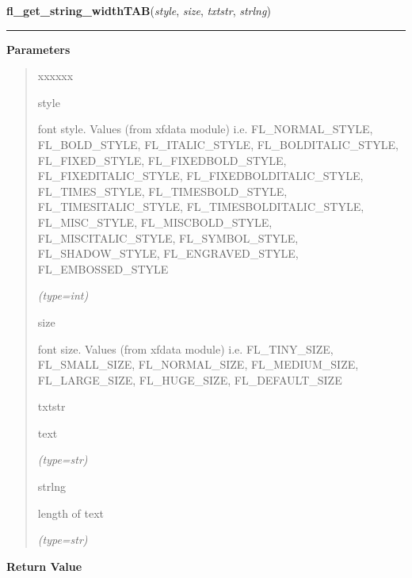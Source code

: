 \hspace{.8\funcindent}\begin{boxedminipage}{\funcwidth}

    \raggedright \textbf{fl\_get\_string\_widthTAB}(\textit{style}, \textit{size}, \textit{txtstr}, \textit{strlng})

    \vspace{-1.5ex}

    \rule{\textwidth}{0.5\fboxrule}
\setlength{\parskip}{2ex}
\setlength{\parskip}{1ex}
      \textbf{Parameters}
      \vspace{-1ex}

      \begin{quote}
        \begin{Ventry}{xxxxxx}

          \item[style]

          font style. Values (from xfdata module) i.e. FL\_NORMAL\_STYLE, 
          FL\_BOLD\_STYLE, FL\_ITALIC\_STYLE, FL\_BOLDITALIC\_STYLE, 
          FL\_FIXED\_STYLE, FL\_FIXEDBOLD\_STYLE, FL\_FIXEDITALIC\_STYLE, 
          FL\_FIXEDBOLDITALIC\_STYLE, FL\_TIMES\_STYLE, 
          FL\_TIMESBOLD\_STYLE, FL\_TIMESITALIC\_STYLE, 
          FL\_TIMESBOLDITALIC\_STYLE, FL\_MISC\_STYLE, FL\_MISCBOLD\_STYLE,
          FL\_MISCITALIC\_STYLE, FL\_SYMBOL\_STYLE, FL\_SHADOW\_STYLE, 
          FL\_ENGRAVED\_STYLE, FL\_EMBOSSED\_STYLE

            {\it (type=int)}

          \item[size]

          font size. Values (from xfdata module) i.e. FL\_TINY\_SIZE, 
          FL\_SMALL\_SIZE, FL\_NORMAL\_SIZE, FL\_MEDIUM\_SIZE, 
          FL\_LARGE\_SIZE, FL\_HUGE\_SIZE, FL\_DEFAULT\_SIZE

          \item[txtstr]

          text

            {\it (type=str)}

          \item[strlng]

          length of text

            {\it (type=str)}

        \end{Ventry}

      \end{quote}

      \textbf{Return Value}
    \vspace{-1ex}


\end{boxedminipage}
